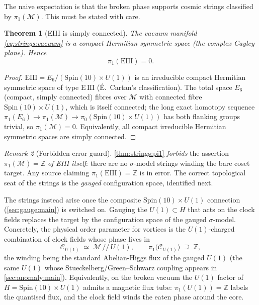 \documentclass[11pt]{article}
\theoremstyle{plain}
\newtheorem{theorem}{Theorem}[section]
\theoremstyle{definition}
\theoremstyle{remark}
\newtheorem{remark}[theorem]{Remark}
\begin{document}
The naive expectation is that the broken phase supports cosmic strings
classified by $\pi_{1}(\mathcal{M})$. This must be stated with care.

\begin{theorem}[EIII is simply connected]
\label{thm:strings:pi1}
The vacuum manifold \eqref{eq:strings:vacuum} is a compact Hermitian
symmetric space (the complex Cayley plane). Hence
\[
   \pi_{1}(\mathrm{EIII})=0 .
\]
\end{theorem}

\begin{proof}
$\mathrm{EIII}=E_{6}/(\mathrm{Spin}(10)\times U(1))$ is an irreducible
compact Hermitian symmetric space of type $\mathrm{E\,III}$
(\'E.~Cartan's classification). The total space $E_{6}$ (compact, simply
connected) fibres over $\mathcal{M}$ with connected fibre
$\mathrm{Spin}(10)\times U(1)$, which is itself connected; the long exact
homotopy sequence
$\pi_{1}(E_{6})\to\pi_{1}(\mathcal{M})\to\pi_{0}(\mathrm{Spin}(10)\times
U(1))$ has both flanking groups trivial, so $\pi_{1}(\mathcal{M})=0$.
Equivalently, all compact irreducible Hermitian symmetric spaces are
simply connected.
\end{proof}

\begin{remark}[Forbidden-error guard]
\label{rem:strings:guard}
\autoref{thm:strings:pi1} \emph{forbids} the assertion
$\pi_{1}(\mathcal{M})=\mathbb{Z}$ \emph{of EIII itself}: there are no
$\sigma$-model strings winding the bare coset target. Any source claiming
$\pi_{1}(\mathrm{EIII})=\mathbb{Z}$ is in error. The correct topological
seat of the strings is the \emph{gauged} configuration space, identified
next.
\end{remark}

The strings instead arise once the composite $\mathrm{Spin}(10)\times
U(1)$ connection (\autoref{sec:gauge:main}) is switched on. Gauging the
$U(1)\subset H$ that acts on the clock fields replaces the target by the
configuration space of the gauged $\sigma$-model. Concretely, the
physical order parameter for vortices is the $U(1)$-charged combination
of clock fields whose phase lives in
\[
   \mathcal{C}_{U(1)} \;\simeq\; \mathcal{M}\,/\!/\,U(1),
   \qquad
   \pi_{1}\bigl(\mathcal{C}_{U(1)}\bigr)\;\supseteq\;\mathbb{Z},
   \label{eq:strings:config}
\]
the winding being the standard Abelian-Higgs flux of the gauged $U(1)$
(the same $U(1)$ whose Stueckelberg/Green--Schwarz coupling appears in
\autoref{sec:anomaly:main}). Equivalently, on the broken vacuum the
$U(1)$ factor of $H=\mathrm{Spin}(10)\times U(1)$ admits a magnetic flux
tube: $\pi_{1}(U(1))=\mathbb{Z}$ labels the quantised flux, and the clock
field winds the eaten phase around the core.
\end{document}
